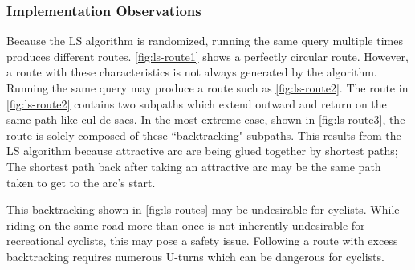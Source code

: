 \documentclass[honors]{union-cs-thesis}
\begin{document}
\subsubsection{Implementation Observations}
\label{sec:ls-observations}
Because the LS algorithm is randomized, running the same query multiple times produces different routes. \cref{fig:ls-route1} shows a perfectly circular route. However, a route with these characteristics is not always generated by the algorithm. Running the same query may produce a route such as \cref{fig:ls-route2}. The route in \cref{fig:ls-route2} contains two subpaths which extend outward and return on the same path like cul-de-sacs. In the most extreme case, shown in \cref{fig:ls-route3}, the route is solely composed of these ``backtracking" subpaths. This results from the LS algorithm because attractive arc are being glued together by shortest paths; The shortest path back after taking an attractive arc may be the same path taken to get to the arc's start.

This backtracking shown in \cref{fig:ls-routes} may be undesirable for cyclists. While riding on the same road more than once is not inherently undesirable for recreational cyclists, this may pose a safety issue. Following a route with excess backtracking requires numerous U-turns which can be dangerous for cyclists.  
\end{document}
